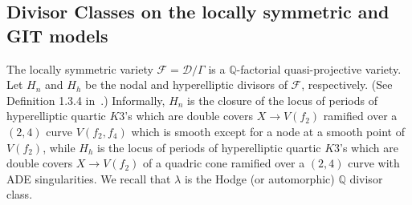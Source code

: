 \documentclass[11pt]{amsart}
\numberwithin{equation}{section}
\theoremstyle{plain}
\theoremstyle{remark}
\theoremstyle{definition}
\newcommand{\bQ}{\mathbb{Q}}
\newcommand{\sF}{\mathscr{F}}
\newcommand{\cD}{{\mathscr D}}
\newcommand{\QQ}{{\mathbb Q}}
\begin{document}
\subsection{Divisor Classes on the locally symmetric and GIT models}
%
The locally symmetric variety $\sF=\cD/\Gamma$ is a $\bQ$-factorial quasi-projective variety. 
 Let $H_n$ and $H_h$ be the nodal and hyperelliptic divisors of $\sF$, respectively. (See Definition 1.3.4 in~\cite{log1}.) Informally, $H_n$ is the closure of the locus of periods of hyperelliptic quartic $K3$'s which are double covers $X\to V(f_2)$ ramified over a $(2,4)$ curve $V(f_2,f_4)$ which is smooth except for a node at a smooth point of $V(f_2)$, while $H_h$ is the locus of periods of hyperelliptic quartic $K3$'s which are double covers $X\to V(f_2)$ of a quadric cone ramified over a $(2,4)$ curve with ADE singularities. We recall that $\lambda$ is the Hodge (or automorphic) $\QQ$ divisor class.
\end{document}
